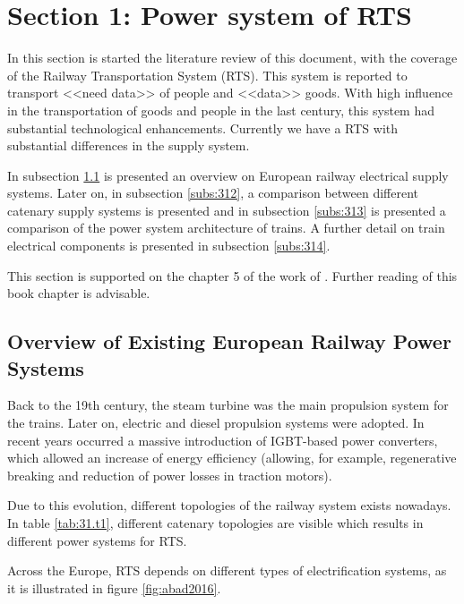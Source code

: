 




\section{Section 1: Power system of RTS}


In this section is started the literature review of this document, with the coverage of the Railway Transportation System (RTS). This system is reported to transport <<need data>> of people and <<data>> goods. With high influence in the transportation of goods and people in the last century, this system had substantial technological enhancements. Currently we have a RTS with substantial differences in the supply system.

In subsection \ref{subs:311} is presented an overview on European railway electrical supply systems. Later on, in subsection \ref{subs:312}, a comparison between different catenary supply systems is presented and in subsection \ref{subs:313} is presented a comparison of the power system architecture of trains. A further detail on train electrical components is presented in subsection \ref{subs:314}.

This section is supported on the chapter 5 of the work of \cite{abad2016}. Further reading of this book chapter is advisable. 

\subsection{Overview of Existing European Railway Power Systems}
\label{subs:311}
Back to the 19th century, the steam turbine was the main propulsion system for the trains. Later on, electric and diesel propulsion systems were adopted. In recent years occurred a massive introduction of IGBT-based power converters, which allowed an increase of energy efficiency (allowing, for example, regenerative breaking and reduction of power losses in traction motors).

Due to this evolution, different topologies of the railway system exists nowadays. In table \ref{tab:31.t1}, different catenary topologies are visible which results in different power systems for RTS.




Across the Europe, RTS depends on different types of electrification systems, as it is illustrated in figure \ref{fig:abad2016}.


